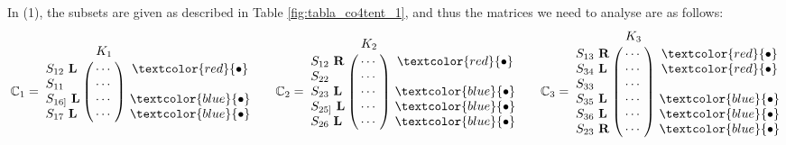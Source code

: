 \documentclass[12pt]{book}
\theoremstyle{plain}
\theoremstyle{remark}
\begin{document}
In (1), the subsets are given as described in Table \ref{fig:tabla_co4tent_1}, and thus the matrices we need to analyse are as follows:
\[ \mathbb C_1 = \bordermatrix{ & K_1\cr
				S_{12}\ \textbf{L} & \cdots \cr
		         S_{11}\            & \cdots \cr
                S_{16]}\ \textbf{L} & \cdots \cr
                S_{17}\ \textbf{L} & \cdots }\
                \begin{matrix}
                \textcolor{red}{\bullet} \\ \\ \textcolor{blue}{\bullet} \\ \textcolor{blue}{\bullet} 
                \end{matrix} \qquad
   \mathbb C_2 = \bordermatrix{ & K_2\cr
				S_{12}\ \textbf{R} & \cdots \cr
                S_{22}\            & \cdots \cr
                S_{23}\ \textbf{L} & \cdots \cr
                S_{25]}\ \textbf{L} & \cdots \cr
                S_{26}\ \textbf{L} & \cdots }\
                \begin{matrix}
                \textcolor{red}{\bullet} \\ \\ \textcolor{blue}{\bullet} \\ \textcolor{blue}{\bullet} \\ \textcolor{blue}{\bullet} 
                \end{matrix} \qquad
   \mathbb C_3 = \bordermatrix{ & K_3\cr
                S_{13}\ \textbf{R} & \cdots \cr
                S_{34}\ \textbf{L} & \cdots \cr
                S_{33}\            & \cdots \cr
                S_{35}\ \textbf{L} & \cdots \cr
                S_{36}\ \textbf{L} & \cdots \cr
                S_{23}\ \textbf{R} & \cdots }\
                \begin{matrix}
                \textcolor{red}{\bullet} \\  \textcolor{red}{\bullet} \\ \\ \textcolor{blue}{\bullet} \\ \textcolor{blue}{\bullet} \\ \textcolor{blue}{\bullet} 
                \end{matrix}  \]
                
\end{document}
